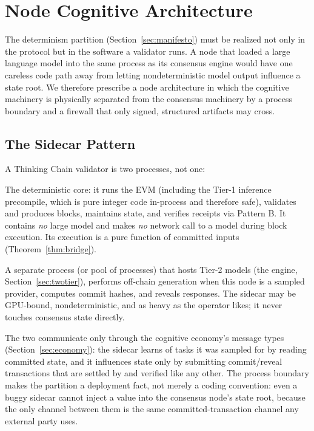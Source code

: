\section{Node Cognitive Architecture}
\label{sec:node}

The determinism partition (Section~\ref{sec:manifesto}) must be realized not only in the protocol but in the software a validator runs. A node that loaded a large language model into the same process as its consensus engine would have one careless code path away from letting nondeterministic model output influence a state root. We therefore prescribe a node architecture in which the cognitive machinery is physically separated from the consensus machinery by a process boundary and a firewall that only signed, structured artifacts may cross.

\subsection{The Sidecar Pattern}

A Thinking Chain validator is two processes, not one:

\begin{description}[style=nextline,leftmargin=0pt]
\item[The consensus node.] The deterministic core: it runs the EVM (including the Tier-1 inference precompile, which is pure integer code in-process and therefore safe), validates and produces blocks, maintains state, and verifies receipts via Pattern B. It contains \emph{no} large model and makes \emph{no} network call to a model during block execution. Its execution is a pure function of committed inputs (Theorem~\ref{thm:bridge}).
\item[The cognitive sidecar.] A separate process (or pool of processes) that hosts Tier-2 models (the \Hanzo{} engine, Section~\ref{sec:twotier}), performs off-chain generation when this node is a sampled provider, computes commit hashes, and reveals responses. The sidecar may be GPU-bound, nondeterministic, and as heavy as the operator likes; it never touches consensus state directly.
\end{description}

The two communicate only through the cognitive economy's message types (Section~\ref{sec:economy}): the sidecar learns of tasks it was sampled for by reading committed \AChain{} state, and it influences state only by submitting commit/reveal transactions that are settled by \SCC{} and verified like any other. The process boundary makes the partition a deployment fact, not merely a coding convention: even a buggy sidecar cannot inject a value into the consensus node's state root, because the only channel between them is the same committed-transaction channel any external party uses.


